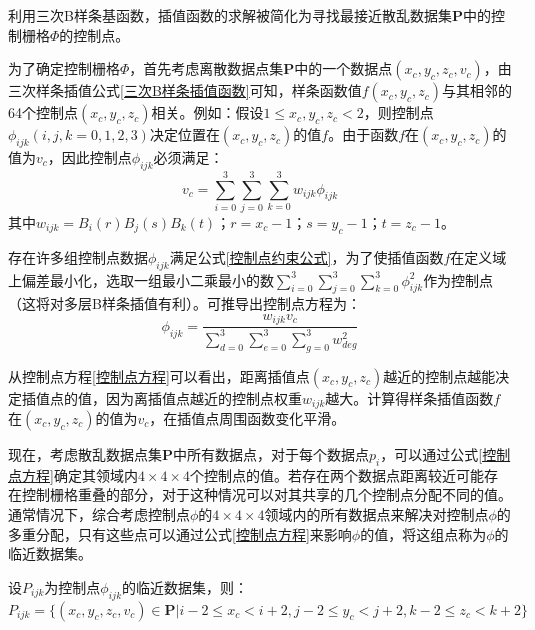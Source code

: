 利用三次B样条基函数，插值函数的求解被简化为寻找最接近散乱数据集$ \mathbf{P} $中的控制栅格$ \Phi $的控制点。

为了确定控制栅格$ \Phi $，首先考虑离散数据点集$ \mathbf{P} $中的一个数据点$ \left( x_{c}, y_{c}, z_{c}, v_{c} \right) $，由三次样条插值公式\ref{三次B样条插值函数}可知，样条函数值$ f\left( x_{c}, y_{c}, z_{c} \right) $与其相邻的64个控制点$ \left( x_{c}, y_{c}, z_{c} \right) $相关。例如：假设$ 1 \leq x_{c}, y_{c}, z_{c} < 2 $，则控制点$ \phi_{ijk} \left( i,j,k = 0,1,2,3 \right) $决定位置在$ \left( x_{c}, y_{c}, z_{c} \right) $的值$ f $。由于函数$f$在$ \left( x_{c}, y_{c}, z_{c} \right) $的值为$ v_{c} $，因此控制点$ \phi_{ijk} $必须满足：
\begin{equation}
    v_{c} = \sum_{i=0}^{3}\sum_{j=0}^{3}\sum_{k=0}^{3} w_{ijk} \phi_{ijk}
    \label{控制点约束公式}
\end{equation}
其中$ w_{ijk} = B_{i}(r)B_{j}(s)B_{k}(t) $；$ r=x_{c}-1 $；$ s=y_{c}-1 $；$ t=z_{c}-1 $。

存在许多组控制点数据$ \phi_{ijk} $满足公式\ref{控制点约束公式}，为了使插值函数$ f $在定义域上偏差最小化，选取一组最小二乘最小的数$ \sum_{i=0}^{3}\sum_{j=0}^{3}\sum_{k=0}^{3} \phi_{ijk}^{2} $作为控制点（这将对多层B样条插值有利）。可推导出控制点方程为：
\begin{equation}
    \phi_{ijk} = \frac{w_{ijk}v_{c}}{\sum_{d=0}^{3}\sum_{e=0}^{3}\sum_{g=0}^{3}w_{deg}^{2}}
    \label{控制点方程}
\end{equation}

从控制点方程\ref{控制点方程}可以看出，距离插值点$ \left( x_{c}, y_{c}, z_{c} \right) $越近的控制点越能决定插值点的值，因为离插值点越近的控制点权重$ w_{ijk} $越大。计算得样条插值函数$ f $在$ \left( x_{c}, y_{c}, z_{c} \right) $的值为$ v_{c} $，在插值点周围函数变化平滑。

现在，考虑散乱数据点集$ \mathbf{P} $中所有数据点，对于每个数据点$ p_{i} $，可以通过公式\ref{控制点方程}确定其领域内$ 4 \times 4 \times 4 $个控制点的值。若存在两个数据点距离较近可能存在控制栅格重叠的部分，对于这种情况可以对其共享的几个控制点分配不同的值。通常情况下，综合考虑控制点$ \phi $的$ 4 \times 4 \times 4 $领域内的所有数据点来解决对控制点$ \phi $的多重分配，只有这些点可以通过公式\ref{控制点方程}来影响$ \phi $的值，将这组点称为$ \phi $的临近数据集。

设$ P_{ijk} $为控制点$ \phi_{ijk} $的临近数据集，则：
\begin{equation*}
    P_{ijk} = \{ \left( x_{c}, y_{c}, z_{c}, v_{c} \right) \in \mathbf{P} | i-2 \leq x_{c} < i+2, j-2 \leq y_{c} < j+2, k-2 \leq z_{c} < k+2 \}
\end{equation*}

